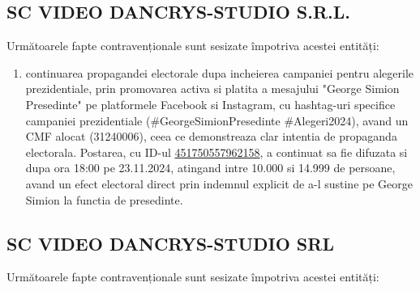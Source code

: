 \documentclass[a4paper,12pt]{article}
\begin{document}
\begin{enumerate}[leftmargin=*, label=\arabic*.)]
\end{enumerate}

\vspace{0.5cm}

\subsection{SC VIDEO DANCRYS-STUDIO S.R.L.}
Următoarele fapte contravenționale sunt sesizate împotriva acestei entități:

\begin{enumerate}[leftmargin=*, label=\arabic*.)]
    \item continuarea propagandei electorale dupa incheierea campaniei pentru alegerile prezidentiale, prin promovarea activa si platita a mesajului "George Simion Presedinte" pe platformele Facebook si Instagram, cu hashtag-uri specifice campaniei prezidentiale (\#GeorgeSimionPresedinte \#Alegeri2024), avand un CMF alocat (31240006), ceea ce demonstreaza clar intentia de propaganda electorala. Postarea, cu ID-ul \href{https://www.facebook.com/ads/library/?id=451750557962158}{451750557962158}, a continuat sa fie difuzata si dupa ora 18:00 pe 23.11.2024, atingand intre 10.000 si 14.999 de persoane, avand un efect electoral direct prin indemnul explicit de a-l sustine pe George Simion la functia de presedinte.
\end{enumerate}

\vspace{0.5cm}

\subsection{SC VIDEO DANCRYS-STUDIO SRL}
Următoarele fapte contravenționale sunt sesizate împotriva acestei entități:
\end{document}
